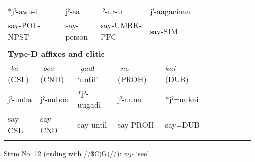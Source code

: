 \begin{tabularx}{\textwidth}{XXm{}XXXXXXXXXXXXXXXXXXXX}
\multicolumn{4}{X}{{ *jˀ-awu-i}} & \multicolumn{3}{X}{jˀ-aa} & \multicolumn{5}{X}{jˀ-ur-u} & \multicolumn{4}{X}{{ jˀ-aagacinaa}} & \multicolumn{7}{X}{}\\
\multicolumn{4}{X}{say-POL-NPST} & \multicolumn{3}{X}{say-person} & \multicolumn{5}{X}{say-UMRK-PFC} & \multicolumn{4}{X}{say-SIM} & \multicolumn{7}{X}{}\\
\multicolumn{23}{X}{}\\
\multicolumn{23}{X}{{\bfseries Type-D affixes and clitic}}\\
{ \textit{{}-ba} (CSL)} & \multicolumn{4}{X}{{ \textit{{}-boo} (CND)}} & \multicolumn{4}{X}{{ \textit{{}-gadɨ} ‘until’}} & \multicolumn{4}{X}{{ \textit{{}-na} (PROH)}} & \multicolumn{4}{X}{{ \textit{kai} (DUB)}} & \multicolumn{6}{X}{}\\
{ jˀ-uuba} & \multicolumn{4}{X}{{ jˀ-uuboo}} & \multicolumn{4}{X}{{ *jˀ-uugadɨ}} & \multicolumn{4}{X}{{ jˀ-uuna}} & \multicolumn{4}{X}{{ *jˀ=uukai}} & \multicolumn{6}{X}{}\\
say-CSL & \multicolumn{4}{X}{say-CND} & \multicolumn{4}{X}{say-until} & \multicolumn{4}{X}{say-PROH} & \multicolumn{4}{X}{say=DUB} & \multicolumn{6}{X}{}\\
\lspbottomrule
\end{tabularx}
Stem No. 12 (ending with //\$C(G)//): \textit{mj-} ‘see’

\tablefirsthead{}

